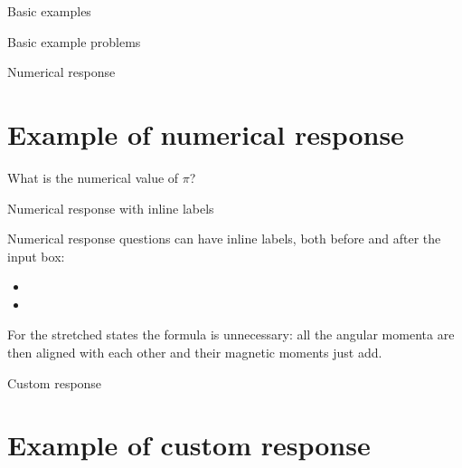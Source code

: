 \begin{edXchapter}{Basic examples}
\begin{edXsection}{Basic example problems}
\begin{edXvertical}
\begin{edXproblem}{Numerical response}
\section{Example of numerical response}  

What is the numerical value of $\pi$?


\end{edXproblem}


\begin{edXproblem}{Numerical response with inline labels}{}

Numerical response questions can have inline labels, both before and after the input box:

\begin{itemize}

\item  

     

\item  

     

\end{itemize}

\begin{edXsolution}

For the stretched states the formula is unnecessary: all the angular momenta are
then aligned with each other and their magnetic moments just add. 

\end{edXsolution}

\end{edXproblem}

\end{edXvertical}


\begin{edXvertical}


\begin{edXproblem}{Custom response}

\section{Example of custom response}  


\end{edXproblem}
\end{edXvertical}
\end{edXsection}
\end{edXchapter}

